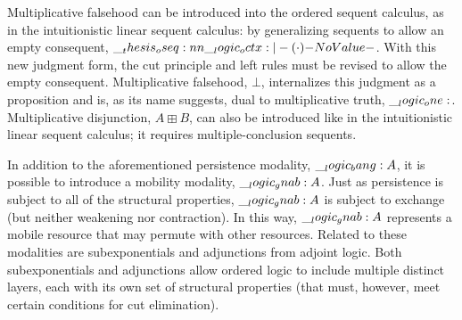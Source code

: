 
Multiplicative falsehood can be introduced into
the ordered sequent calculus, as in the intuitionistic linear sequent calculus:
by generalizing %
sequents to %
allow
an empty consequent, $\oseq{\octx |- (\cdot)}$.\autocite{Chang+:CMU03}
With this new judgment form, the cut principle and left rules must be revised to allow the empty consequent.
% 
Multiplicative falsehood, $\bot$, internalizes this judgment as a proposition and is, as its name suggests, dual to multiplicative truth, $\__logic_one:$.
Multiplicative disjunction, $A \boxplus B$, can also be introduced like in the intuitionistic linear sequent calculus; it requires multiple-conclusion sequents.\autocite{Chang+:CMU03}


In addition to the aforementioned persistence modality, $\__logic_bang: A$, it is possible to introduce a mobility modality, $\__logic_gnab: A$.\autocite{Polakow+Pfenning:MFPS99}
Just as persistence is subject to all of the structural properties, $\__logic_gnab: A$ is subject to exchange (but neither weakening nor contraction).
In this way, $\__logic_gnab: A$ represents a mobile resource that may permute with other resources.
Related to these modalities are subexponentials\autocites{Nigam+Miller:PPDP09}{Kanovich+:MSCS19} and adjunctions from adjoint logic\autocites{Benton:CSL94}{Pruiksma+:18}.
Both subexponentials and adjunctions allow ordered logic to include multiple distinct layers, each with its own set of structural properties (that must, however, meet certain conditions for cut elimination).





